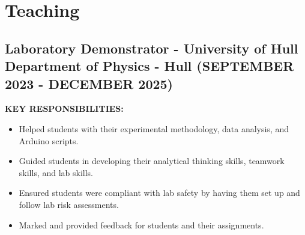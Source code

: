 \documentclass{article}
\begin{document}
\section{Teaching}
\subsection{Laboratory Demonstrator - \textnormal{University of Hull Department of Physics - Hull} \footnotesize{(SEPTEMBER 2023 - DECEMBER 2025)}}
\begin{minipage}[t]{1\textwidth}
    \footnotesize{\textbf{KEY RESPONSIBILITIES:}}
    \normalsize{}
    \begin{itemize}[leftmargin=*]
        \item Helped students with their experimental methodology, data analysis, and Arduino scripts. 
        \item Guided students in developing their analytical thinking skills, teamwork skills, and lab skills. 
        \item Ensured students were compliant with lab safety by having them set up and follow lab risk assessments. 
        \item Marked and provided feedback for students and their assignments.     
    \end{itemize}
\end{minipage}
\end{document}
